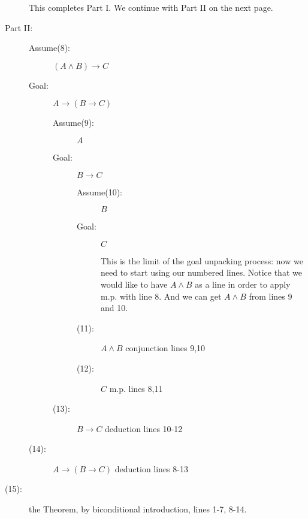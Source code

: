 \documentclass[12pt]{article}
\begin{document}
\begin{description}
\begin{description}
\end{description}

This completes Part I.  We continue with Part II on the next page.

\newpage

\item[Part II:]

\begin{description}

\item[Assume(8):]  $(A \wedge B) \rightarrow C$

\item[Goal:]  $A \rightarrow (B \rightarrow C)$

\begin{description}

\item[Assume(9):]  $A$

\item[Goal:] $B \rightarrow C$

\begin{description}

\item[Assume(10):]  $B$

\item[Goal:] $C$

This is the limit of the goal unpacking process: now we need to start using our numbered lines.  Notice that we
would like to have $A \wedge B$ as a line in order to apply m.p. with line 8.  And we can get $A \wedge B$ from lines 9 and 10.

\item[(11):]  $A \wedge B$  conjunction lines 9,10

\item[(12):]  $C$ m.p. lines 8,11

\end{description}

\item[(13):]  $B \rightarrow C$  deduction lines 10-12

\end{description}

\item[(14):]  $A \rightarrow (B \rightarrow C)$ deduction lines 8-13

\end{description}

\item[(15):]  the Theorem, by biconditional introduction, lines 1-7, 8-14.




\end{description}
\end{document}
